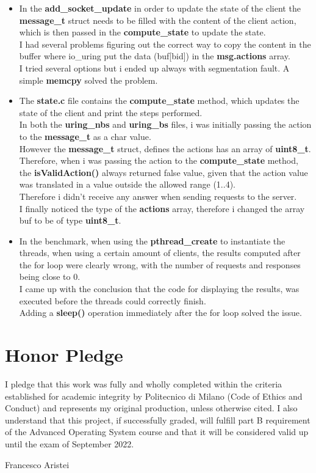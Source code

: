 \begin{itemize}
    \item In the \textbf{add\_socket\_update} in order to update the state of the client the \textbf{message\_t} struct needs to be filled with the content of the client action, which is then passed in the \textbf{compute\_state} to update the state. \\I had several problems figuring out the correct way to copy the content in the buffer where io\_uring put the data (buf[bid]) in the \textbf{msg.actions} array.\\ I tried several options but i ended up always with segmentation fault. A simple \textbf{memcpy} solved the problem.
    \item The \textbf{state.c} file contains the \textbf{compute\_state} method, which updates the state of the client and print the steps performed.\\ In both the \textbf{uring\_nbs} and \textbf{uring\_bs} files, i was initially passing the action to the \textbf{message\_t} as a char value. \\ However the \textbf{message\_t} struct, defines the actions has an array of \textbf{uint8\_t}.\\ Therefore, when i was passing the action to the \textbf{compute\_state} method, the \textbf{isValidAction()} always returned false value, given that the action value was translated in a value outside the allowed range (1..4).\\ Therefore i didn't receive any answer when sending requests to the server. \\ I finally noticed the type of the \textbf{actions} array, therefore i changed the array buf to be of type \textbf{uint8\_t}.
    \item In the benchmark, when using the \textbf{pthread\_create} to instantiate the threads, when using a certain amount of clients, the results computed after the for loop were clearly wrong, with the number of requests and responses being close to 0. \\ I came up with the conclusion that the code for displaying the results, was executed before the threads could correctly finish. \\ Adding a \textbf{sleep()} operation immediately after the for loop solved the issue.
    
\end{itemize}

\section{Honor Pledge}
I pledge that this work was fully and wholly completed within the criteria established for academic integrity by Politecnico di Milano
(Code of Ethics and Conduct) and represents my original production, unless otherwise cited.
I also understand that this project, if successfully graded, will fulfill part B requirement of the Advanced Operating System course
 and that it will be considered valid up until the exam of September 2022.

\begin{flushright}
        Francesco Aristei
\end{flushright}


  
